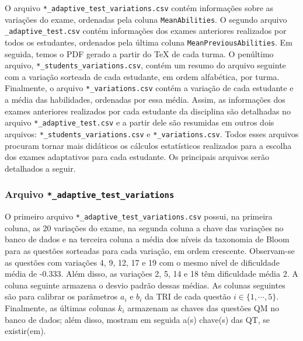 O arquivo \verb|*_adaptive_test_variations.csv| contém informações sobre as variações do exame, ordenadas pela coluna \verb|MeanAbilities|. O segundo arquivo \verb|_adaptive_test.csv| contém informações dos exames anteriores realizados por todos os estudantes, ordenados pela última coluna \verb|MeanPreviousAbilities|. Em seguida, temos o PDF gerado a partir do \TeX{} de cada turma. O penúltimo arquivo, \verb|*_students_variations.csv|, contém um resumo do arquivo seguinte com a variação sorteada de cada estudante, em ordem alfabética, por turma. Finalmente, o arquivo \verb|*_variations.csv| contém a variação de cada estudante e a média das habilidades, ordenadas por essa média. Assim, as informações dos exames anteriores realizados por cada estudante da disciplina são detalhadas no arquivo \verb|*_adaptive_test.csv| e a partir dele são resumidas em outros dois arquivos: \verb|*_students_variations.csv| e \verb|*_variations.csv|. Todos esses arquivos procuram tornar mais didáticos os cálculos estatísticos realizados para a escolha dos exames adaptativos para cada estudante. Os principais arquivos serão detalhados a seguir.

\subsubsection{Arquivo \texttt{*\_adaptive\_test\_variations}}\label{sec:adaptiveTestVariations}

O primeiro arquivo \verb|*_adaptive_test_variations.csv| possui, na primeira coluna, as 20 variações do exame, na segunda coluna a chave das variações no banco de dados e na terceira coluna a média dos níveis da taxonomia de Bloom para as questões sorteadas para cada variação, em ordem crescente. Observam-se as questões com variações 4, 9, 12, 17 e 19 com o mesmo nível de dificuldade média de -0.333. Além disso, as variações 2, 5, 14 e 18 têm dificuldade média 2. A coluna seguinte armazena o desvio padrão dessas médias. As colunas seguintes são para calibrar os parâmetros $a_i$ e $b_i$ da TRI de cada questão $i\in\{1,\cdots,5\}$. Finalmente, as últimas colunas $k_i$ armazenam as chaves das questões QM no banco de dados; além disso, mostram em seguida a(s) chave(s) das QT, se existir(em).


